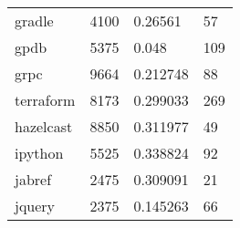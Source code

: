\begin{table*}[]
\begin{tabular}{llll}
gradle                               & 4100                               & 0.26561                                                                                                           & 57                                                                                                            \\
gpdb                           & 5375                               & 0.048                                                                                                             & 109                                                                                                           \\
grpc                                   & 9664                               & 0.212748                                                                                                          & 88                                                                                                            \\
terraform                         & 8173                               & 0.299033                                                                                                          & 269                                                                                                           \\
hazelcast                         & 8850                               & 0.311977                                                                                                          & 49                                                                                                            \\
ipython                             & 5525                               & 0.338824                                                                                                          & 92                                                                                                            \\
jabref                               & 2475                               & 0.309091                                                                                                          & 21                                                                                                            \\
jquery                               & 2375                               & 0.145263                                                                                                          & 66                                                                                                            \\

\end{tabular}
\end{table*}
